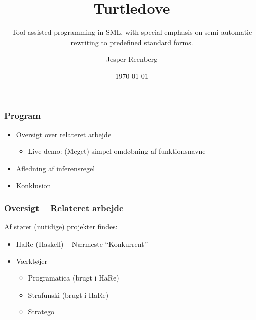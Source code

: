 \documentclass[slidestop,compress,mathserif, xcolor=dvipsnames]{beamer}
\title[]{Turtledove}
\subtitle{\tiny{Tool assisted programming in SML, with special emphasis on
    semi-automatic\\ rewriting to predefined standard forms.}}
\author{Jesper Reenberg}
\institute[DIKU]{Department of Computer Science}
\date[]{\today}
\begin{document}
\frame[plain]{\titlepage}

\begin{frame}[c]
  \frametitle{Program}

  \begin{itemize}
  \item Oversigt over relateret arbejde
    \begin{itemize}
    \item Live demo: (Meget) simpel omdøbning af funktionsnavne
    \end{itemize}

  \item Afledning af inferensregel

  \item Konklusion
  \end{itemize}
  
\end{frame}

\begin{frame}[c]
  \frametitle{Oversigt -- Relateret arbejde}  
  Af stører (nutidige) projekter findes:
  
  \begin{itemize}
  \item HaRe {\footnotesize{(Haskell)}} -- Nærmeste "`Konkurrent"'
    
  \item Værktøjer       
    \begin{itemize}
    \item Programatica {\footnotesize{(brugt i HaRe)}}
    \item Strafunski {\footnotesize{(brugt i HaRe)}}
    \item Stratego
    \end{itemize}       
  \end{itemize}

\end{frame}
\end{document}
